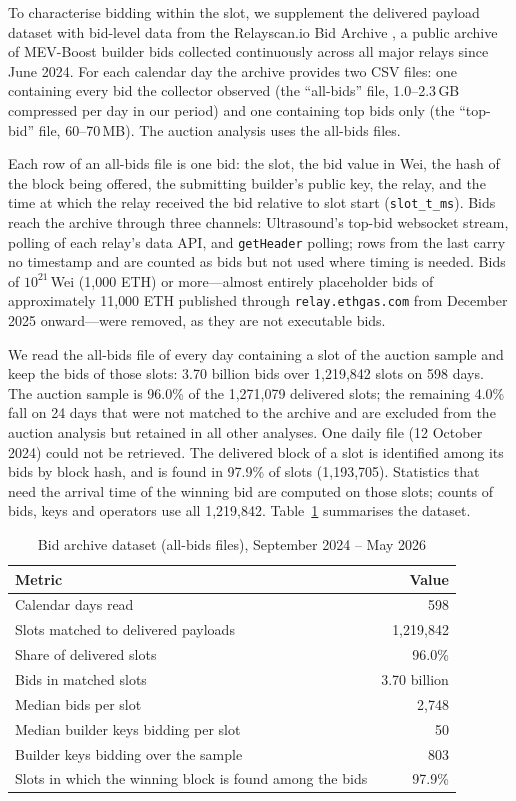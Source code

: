 \documentclass[11pt]{article}
\begin{document}
To characterise bidding within the slot, we supplement the delivered payload
dataset with bid-level data from the Relayscan.io Bid Archive
\citep{relayscan2024}, a public archive of MEV-Boost builder bids collected
continuously across all major relays since June 2024. For each calendar day
the archive provides two CSV files: one containing every bid the collector
observed (the ``all-bids'' file, 1.0--2.3\,GB compressed per day in our
period) and one containing top bids only (the ``top-bid'' file, 60--70\,MB).
The auction analysis uses the all-bids files.

Each row of an all-bids file is one bid: the slot, the bid value in Wei, the
hash of the block being offered, the submitting builder's public key, the
relay, and the time at which the relay received the bid relative to slot
start (\texttt{slot\_t\_ms}). Bids reach the archive through three channels:
Ultrasound's top-bid websocket stream, polling of each relay's data API, and
\texttt{getHeader} polling; rows from the last carry no timestamp and are
counted as bids but not used where timing is needed. Bids of $10^{21}$\,Wei
(1{,}000 ETH) or more---almost entirely placeholder bids of approximately
11{,}000 ETH published through \texttt{relay.ethgas.com} from December 2025
onward---were removed, as they are not executable bids.

We read the all-bids file of every day containing a slot of the auction
sample and keep the bids of those slots: 3.70 billion bids over 1,219,842
slots on 598 days. The auction sample is 96.0\% of the 1,271,079 delivered
slots; the remaining 4.0\% fall on 24 days that were not
matched to the archive and are excluded from the auction analysis but
retained in all other analyses. One daily file (12 October 2024) could not be
retrieved. The delivered block of a slot is identified among its bids by
block hash, and is found in 97.9\% of slots (1,193,705). Statistics that need
the arrival time of the winning bid are computed on those slots; counts of
bids, keys and operators use all 1,219,842. Table~\ref{tab:bidarchive}
summarises the dataset.

\begin{table}[!htbp]
\centering
\caption{Bid archive dataset (all-bids files), September 2024 -- May 2026}
\label{tab:bidarchive}
\begin{tabular}{lr}
\toprule
Metric & Value \\
\midrule
Calendar days read & 598 \\
Slots matched to delivered payloads & 1,219,842 \\
Share of delivered slots & 96.0\% \\
Bids in matched slots & 3.70 billion \\
Median bids per slot & 2,748 \\
Median builder keys bidding per slot & 50 \\
Builder keys bidding over the sample & 803 \\
Slots in which the winning block is found among the bids & 97.9\% \\
\bottomrule
\end{tabular}
\end{table}
\end{document}
